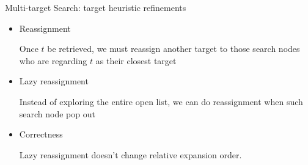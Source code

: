 \begin{frame}{Multi-target Search: target heuristic refinements}
\begin{minipage}{.9\textwidth}
\begin{itemize}
    \item \small{Reassignment}
    \begin{definition}
        \small Once $t$ be retrieved, we must reassign another target to those search nodes who are regarding $t$ as their closest target
    \end{definition}
    \item \small{Lazy reassignment}
    \begin{definition}
        \small Instead of exploring the entire open list, we can do reassignment when such search node pop out
    \end{definition}
    \item \small{Correctness}
    \begin{lemma}
        \small Lazy reassignment doesn't change relative expansion order.
    \end{lemma}
\end{itemize}
\end{minipage}%
\end{frame}